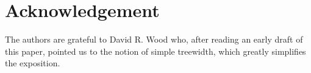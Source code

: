 \documentclass[kpfonts]{patmorin}
\theoremstyle{named}
\begin{document}
%
%

\section*{Acknowledgement}

The authors are grateful to David R. Wood who, after reading an early draft of this paper, pointed us to the notion of simple treewidth, which greatly simplifies the exposition.




\end{document}

